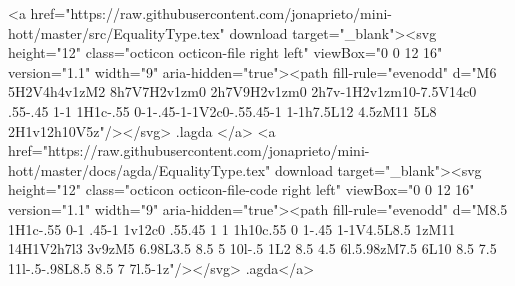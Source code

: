 {        <a href="https://raw.githubusercontent.com/jonaprieto/mini-hott/master/src/EqualityType.tex" download target="_blank"><svg height="12" class="octicon octicon-file right left" viewBox="0 0 12 16" version="1.1" width="9" aria-hidden="true"><path fill-rule="evenodd" d="M6 5H2V4h4v1zM2 8h7V7H2v1zm0 2h7V9H2v1zm0 2h7v-1H2v1zm10-7.5V14c0 .55-.45 1-1 1H1c-.55 0-1-.45-1-1V2c0-.55.45-1 1-1h7.5L12 4.5zM11 5L8 2H1v12h10V5z"/></svg> .lagda </a>
        <a href="https://raw.githubusercontent.com/jonaprieto/mini-hott/master/docs/agda/EqualityType.tex" download target="_blank"><svg height="12" class="octicon octicon-file-code right left" viewBox="0 0 12 16" version="1.1" width="9" aria-hidden="true"><path fill-rule="evenodd" d="M8.5 1H1c-.55 0-1 .45-1 1v12c0 .55.45 1 1 1h10c.55 0 1-.45 1-1V4.5L8.5 1zM11 14H1V2h7l3 3v9zM5 6.98L3.5 8.5 5 10l-.5 1L2 8.5 4.5 6l.5.98zM7.5 6L10 8.5 7.5 11l-.5-.98L8.5 8.5 7 7l.5-1z"/></svg> .agda</a>
      
}
